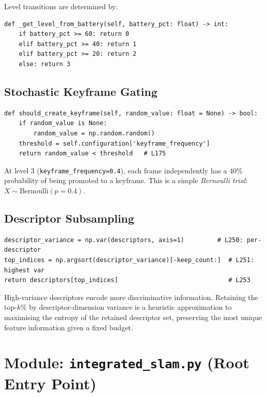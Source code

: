 \documentclass[12pt,a4paper,twoside]{report}
\theoremstyle{definition}
\newcommand{\code}[1]{\texttt{#1}}
\begin{document}
\noindent Level transitions are determined by:
\begin{lstlisting}
def _get_level_from_battery(self, battery_pct: float) -> int:
    if battery_pct >= 60: return 0
    elif battery_pct >= 40: return 1
    elif battery_pct >= 20: return 2
    else: return 3
\end{lstlisting}

\section{Stochastic Keyframe Gating}

\begin{lstlisting}
def should_create_keyframe(self, random_value: float = None) -> bool:
    if random_value is None:
        random_value = np.random.random()
    threshold = self.configuration['keyframe_frequency']
    return random_value < threshold   # L175
\end{lstlisting}

At level 3 (\code{keyframe\_frequency=0.4}), each frame independently has a
$40\%$ probability of being promoted to a keyframe. This is a simple
\emph{Bernoulli trial}: $X \sim \text{Bernoulli}(p=0.4)$.

\section{Descriptor Subsampling}

\begin{lstlisting}
descriptor_variance = np.var(descriptors, axis=1)         # L250: per-descriptor
top_indices = np.argsort(descriptor_variance)[-keep_count:]  # L251: highest var
return descriptors[top_indices]                              # L253
\end{lstlisting}

\begin{notebox}
High-variance descriptors encode more discriminative information. Retaining
the top-$k\%$ by descriptor-dimension variance is a heuristic approximation
to maximising the entropy of the retained descriptor set, preserving the most
unique feature information given a fixed budget.
\end{notebox}

\chapter{Module: \texttt{integrated\_slam.py} (Root Entry Point)}
\end{document}
